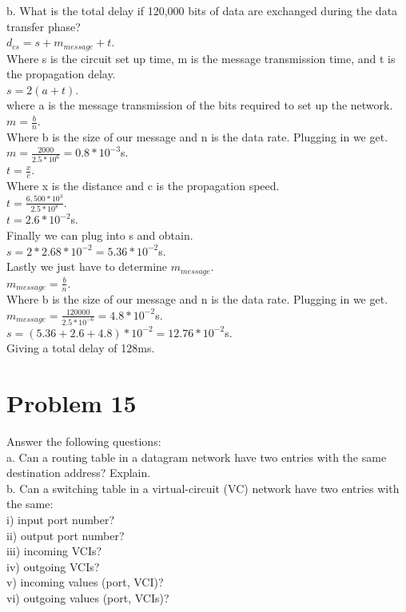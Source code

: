 \documentclass{article}
\begin{document}
\subP b. What is the total delay if 120,000 bits of data are exchanged during the data transfer
phase?\\
$d_{cs} = s + m_{message} + t$.\\
Where s is the circuit set up time, m is the message transmission time, and t is the propagation delay.\\
$s = 2(a + t)$.\\
where a is the message transmission of the bits required to set up the network.\\
$m = \frac{b}{n}$.\\
Where b is the size of our message and n is the data rate. Plugging in we get.\\
$m = \frac{2000}{2.5*10^{6}} = 0.8 * 10^{-3}$s.\\
$t = \frac{x}{c}$.\\
Where x is the distance and c is the propagation speed.\\
$t = \frac{6,500 * 10^{3}}{2.5*10^{8}}$.\\
$t = 2.6 * 10^{-2}$s.\\
Finally we can plug into s and obtain.\\
$s = 2 * 2.68 * 10^{-2} = 5.36*10^{-2}$s.\\
Lastly we just have to determine $m_{message}$.\\
$m_{message} = \frac{b}{n}$.\\
Where b is the size of our message and n is the data rate. Plugging in we get.\\
$m_{message} = \frac{120000}{2.5 * 10^{-6}} = 4.8 * 10^{-2}$s.\\
$s = (5.36 + 2.6 + 4.8)*10^{-2} = 12.76 * 10^{-2}$s.\\
Giving a total delay of 128ms.\\

\section*{Problem 15}
Answer the following questions:\\
\subP a. Can a routing table in a datagram network have two entries with the same
destination address? Explain.\\
\subP b. Can a switching table in a virtual-circuit (VC) network have two entries with
the same:\\
\subP\subP i) input port number?\\
\subP\subP ii) output port number?\\
\subP\subP iii) incoming VCIs?\\
\subP\subP iv) outgoing VCIs?\\
\subP\subP v) incoming values (port, VCI)?\\
\subP\subP vi) outgoing values (port, VCIs)?\\
\end{document}
